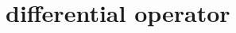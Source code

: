\documentclass[dvipdfmx]{jsarticle}
\begin{document}
\section{differential operator}

\end{document}
